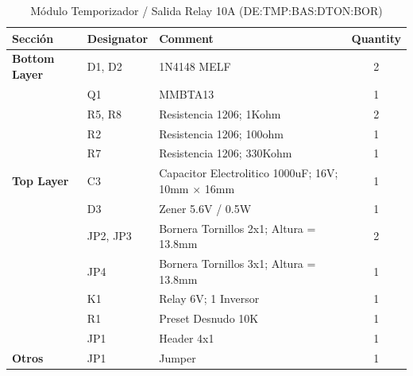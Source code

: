 \documentclass{article}
\begin{document}
\begin{table}[h!]
\centering
\caption{Módulo Temporizador / Salida Relay 10A (DE:TMP:BAS:DTON:BOR)}
\label{tab:bom_temporizador}
\begin{tabular}{lllc}
\toprule
\textbf{Sección} & \textbf{Designator} & \textbf{Comment} & \textbf{Quantity} \\
\midrule
\textbf{Bottom Layer} & D1, D2 & 1N4148 MELF & 2 \\
 & Q1 & MMBTA13 & 1 \\
 & R5, R8 & Resistencia 1206; 1Kohm & 2 \\
 & R2 & Resistencia 1206; 100ohm & 1 \\
 & R7 & Resistencia 1206; 330Kohm & 1 \\
\midrule
\textbf{Top Layer} & C3 & Capacitor Electrolitico 1000uF; 16V; 10mm $\times$ 16mm & 1 \\
 & D3 & Zener 5.6V / 0.5W & 1 \\
 & JP2, JP3 & Bornera Tornillos 2x1; Altura = 13.8mm & 2 \\
 & JP4 & Bornera Tornillos 3x1; Altura = 13.8mm & 1 \\
 & K1 & Relay 6V; 1 Inversor & 1 \\
 & R1 & Preset Desnudo 10K & 1 \\
 & JP1 & Header 4x1 & 1 \\
\midrule
\textbf{Otros} & JP1 & Jumper & 1 \\
\bottomrule
\end{tabular}
\end{table}
\end{document}
